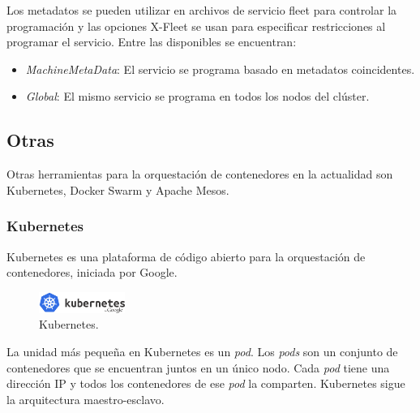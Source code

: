Los metadatos se pueden utilizar en archivos de servicio fleet para controlar la programación y las opciones X-Fleet se usan para especificar restricciones al programar el servicio. Entre las disponibles se encuentran:
\begin{itemize}
\item \textit{MachineMetaData}: El servicio se programa basado en metadatos coincidentes.
\item \textit{Global}: El mismo servicio se programa en todos los nodos del clúster.
\end{itemize}

\subsection{Otras}\label{Otras}

Otras herramientas para la orquestación de contenedores en la actualidad son Kubernetes\cite{kubernetes}, Docker Swarm\cite{swarm} y Apache Mesos\cite{apachemesos}.

\subsubsection{Kubernetes}

Kubernetes es una plataforma de código abierto para la orquestación de contenedores, iniciada por Google.

\begin{figure}[H]
\centering
\includegraphics[width=0.25\textwidth]{images/figures/kubernetes.png}
\caption{Kubernetes.\footnotemark}
\end{figure}


La unidad más pequeña en Kubernetes es un \textit{pod}. Los \textit{pods} son un conjunto de contenedores que se encuentran juntos en un único nodo. Cada \textit{pod} tiene una dirección IP y todos los contenedores de ese \textit{pod} la comparten. Kubernetes sigue la arquitectura maestro-esclavo.

